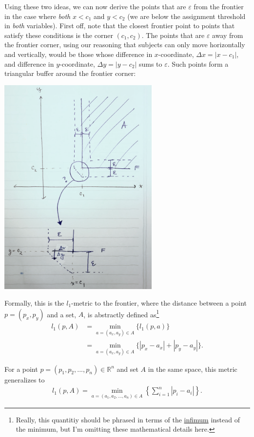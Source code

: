 \documentclass[
]{article}
\begin{document}
Using these two ideas, we can now derive the points that are
\(\varepsilon\) from the frontier in the case where \emph{both}
\(x<c_1\) and \(y<c_2\) (we are below the assignment threshold in
\emph{both} variables). First off, note that the closest frontier point
to points that satisfy these conditions is the corner \((c_1, c_2)\).
The points that are \(\varepsilon\) away from the frontier corner, using
our reasoning that subjects can only move horizontally and vertically,
would be those whose difference in \(x\)-coordinate,
\(\Delta x = |x-c_1|\), and difference in \(y\)-coordinate,
\(\Delta y = |y-c_2|\) sums to \(\varepsilon\). Such points form a
triangular buffer around the frontier corner:

\begin{center}
\includegraphics[width=0.6\textwidth]{figs/f4.png}
\end{center}

Formally, this is the \(l_1\)-metric to the frontier, where the distance
between a point \(p = (p_x,p_y)\) and a set, \(A\), is abstractly
defined
as\footnote{Really, this quantitiy should be phrased in terms of the \href{https://en.wikipedia.org/wiki/Infimum_and_supremum}{infimum} instead of the minimum, but I'm omitting these mathematical details here.}
\begin{align}
l_1(p,A) &= \min_{a=(a_x,a_y) \in A} \{ l_1(p,a)\} \\
&= \min_{a=(a_x,a_y) \in A} \{|p_x-a_x|+|p_y-a_y|\}.
\end{align}

For a point \(p = (p_1, p_2, ..., p_n) \in \mathbb{R}^n\) and set \(A\)
in the same space, this metric generalizes to \begin{align}
l_1(p,A) = \min_{a = (a_1, a_2, ..., a_n) \in A} \left \{ \sum_{i = 1}^n |p_i - a_i| \right \}.
\end{align}
\end{document}
